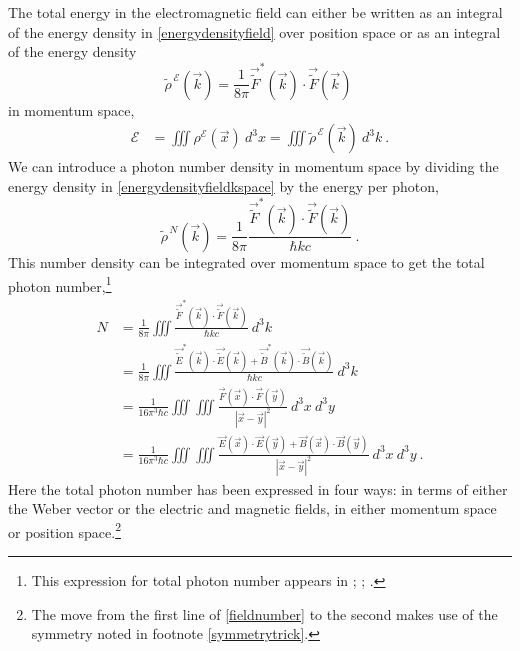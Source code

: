 \documentclass[12pt,secnumarabic,amsmath,amssymb,balancelastpage,nofootinbib]{article}
\begin{document}
The total energy in the electromagnetic field can either be written as an integral of the energy density in \eqref{energydensityfield} over position space or as an integral of the energy density
\begin{equation}
\widetilde{\rho}^{\,\mathcal{E}}(\vec{k})=\frac{1}{8 \pi}\vec{\widetilde{F}}^*\!\!(\vec{k})\cdot\vec{\widetilde{F}}(\vec{k})
\ 
\label{energydensityfieldkspace}
\end{equation}
in momentum space,
\begin{align}
\mathcal{E}&=\iiint{\rho^{\mathcal{E}}(\vec{x}) \: d^3 x}=\iiint{\widetilde{\rho}^{\,\mathcal{E}}(\vec{k}) \: d^3 k}
\ .
\label{energyintegral}
\end{align}
We can introduce a photon number density in momentum space by dividing the energy density in \eqref{energydensityfieldkspace} by the energy per photon,
\begin{equation}
\widetilde{\rho}^{\,N}\!(\vec{k})=\frac{1}{8 \pi}\frac{\vec{\widetilde{F}}^*\!\!(\vec{k})\cdot\vec{\widetilde{F}}(\vec{k})}{\hbar k c}
\ .
\label{numberdensityfieldkspace}
\end{equation}
This number density can be integrated over momentum space to get the total photon number,\footnote{This expression for total photon number appears in \citet{landau1930, good1957, zeldovich}; \citet[pg.\ 318]{bb1996}; \citet{forcesonfields}.}
\begin{align}
N&=\frac{1}{8 \pi}\iiint{ \frac{\vec{\widetilde{F}}^*\!\!(\vec{k})\cdot\vec{\widetilde{F}}(\vec{k})}{\hbar k c} \: d^3 k}
\nonumber
\\
&=\frac{1}{8 \pi}\iiint{ \frac{\vec{\widetilde{E}}^*\!\!(\vec{k})\cdot\vec{\widetilde{E}}(\vec{k})+\vec{\widetilde{B}}^{*}\!\!(\vec{k})\cdot\vec{\widetilde{B}}(\vec{k})}{\hbar k c} \: d^3 k}
\nonumber
\\
&=\frac{1}{16 \pi^3 \hbar c}\iiint{\!\!\!\iiint{ \frac{\vec{F}(\vec{x})\cdot \vec{F}(\vec{y})}{|\vec{x}-\vec{y}|^2} \: d^3 x\: d^3 y}}
\nonumber
\\
&=\frac{1}{16 \pi^3 \hbar c}\iiint{\!\!\!\iiint{ \frac{\vec{E}(\vec{x})\cdot \vec{E}(\vec{y})+\vec{B}(\vec{x})\cdot \vec{B}(\vec{y})}{|\vec{x}-\vec{y}|^2} \: d^3 x\: d^3 y}}
\ .
\label{fieldnumber}
\end{align}
Here the total photon number has been expressed in four ways: in terms of either the Weber vector or the electric and magnetic fields, in either momentum space or position space.\footnote{The move from the first line of \eqref{fieldnumber} to the second makes use of the symmetry noted in footnote \ref{symmetrytrick}.}
\end{document}
